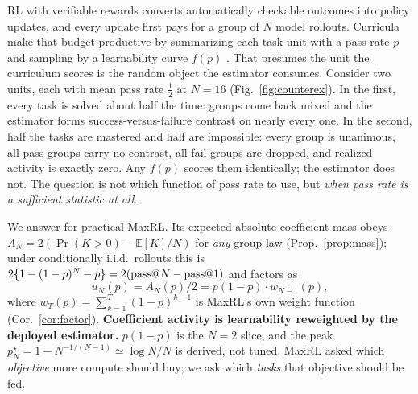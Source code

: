 RL with verifiable rewards converts automatically checkable outcomes into
policy updates, and every update first pays for a group of $N$ model rollouts.
Curricula make that budget productive by summarizing each task unit with a pass
rate $p$ and sampling by a learnability curve $f(p)$ \citep{procurl,sfl}. That
presumes the unit the curriculum scores is the random object the estimator
consumes. Consider two units, each with mean pass rate $\tfrac12$ at $N{=}16$
(Fig.~\ref{fig:counterex}). In the first, every task is solved about half the
time: groups come back mixed and the estimator forms success-versus-failure
contrast on nearly every one. In the second, half the tasks are mastered and
half are impossible: every group is unanimous, all-pass groups carry no
contrast, all-fail groups are dropped, and realized activity is exactly zero.
Any $f(\bar p)$ scores them identically; the estimator does not. The question
is not which function of pass rate to use, but \emph{when pass rate is a
sufficient statistic at all}.

We answer for practical MaxRL. Its expected absolute coefficient mass obeys
$A_N=2(\Pr(K{>}0)-\mathbb E[K]/N)$ for \emph{any} group law
(Prop.~\ref{prop:mass}); under conditionally i.i.d.\ rollouts this is
$2\{1-(1-p)^N-p\}=2(\text{pass@}N-\text{pass@}1)$ and factors as
\[
u_N(p)=A_N(p)/2=p(1-p)\cdot w_{N-1}(p),
\]
where $w_T(p)=\sum_{k=1}^{T}(1-p)^{k-1}$ is MaxRL's own weight function
(Cor.~\ref{cor:factor}). \textbf{Coefficient activity is learnability
reweighted by the deployed estimator.} $p(1-p)$ is the $N{=}2$ slice, and the
peak $p^\star_N=1-N^{-1/(N-1)}\simeq\log N/N$ is derived, not tuned. MaxRL
asked which \emph{objective} more compute should buy; we ask which
\emph{tasks} that objective should be fed.

